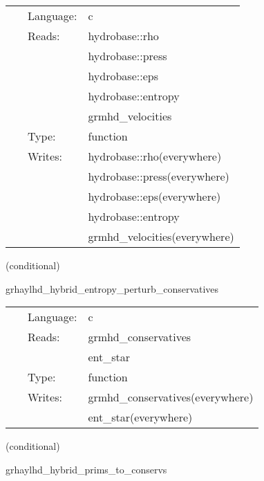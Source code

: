  \begin{tabular*}{160mm}{cll} 
~ & Language:  & c \\ 
~ & Reads:  & hydrobase::rho \\ 
~& ~ &hydrobase::press\\ 
~& ~ &hydrobase::eps\\ 
~& ~ &hydrobase::entropy\\ 
~& ~ &grmhd\_velocities\\ 
~ & Type:  & function \\ 
~ & Writes:  & hydrobase::rho(everywhere) \\ 
~& ~ &hydrobase::press(everywhere)\\ 
~& ~ &hydrobase::eps(everywhere)\\ 
~& ~ &hydrobase::entropy\\ 
~& ~ &grmhd\_velocities(everywhere)\\ 
\end{tabular*} 


\vspace{5mm}

   (conditional) 

\hspace{5mm} grhaylhd\_hybrid\_entropy\_perturb\_conservatives 

\hspace{5mm}{\it entropy+hybrid version of grhaylhd\_perturb\_conservatives } 


\hspace{5mm}

 \begin{tabular*}{160mm}{cll} 
~ & Language:  & c \\ 
~ & Reads:  & grmhd\_conservatives \\ 
~& ~ &ent\_star\\ 
~ & Type:  & function \\ 
~ & Writes:  & grmhd\_conservatives(everywhere) \\ 
~& ~ &ent\_star(everywhere)\\ 
\end{tabular*} 


\vspace{5mm}

   (conditional) 

\hspace{5mm} grhaylhd\_hybrid\_prims\_to\_conservs 

\hspace{5mm}{\it hybrid version of grhaylhd\_prims\_to\_conservs } 


